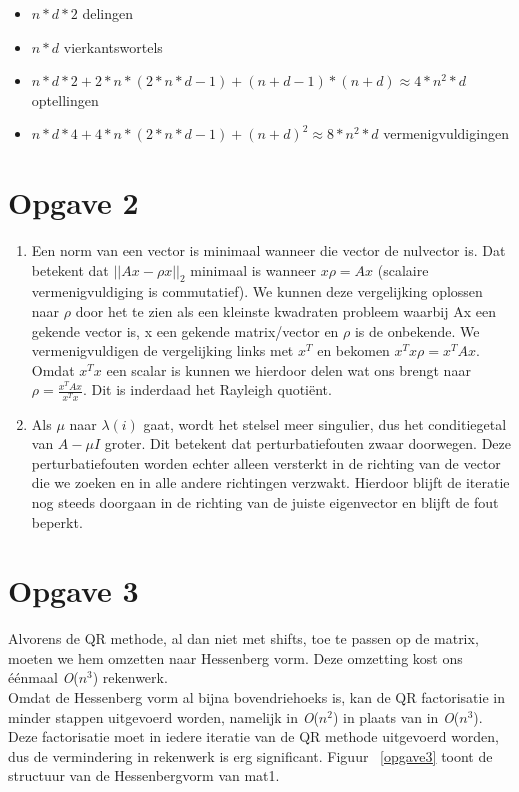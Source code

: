 \documentclass[]{article}
\newcommand{\opgave}[1]{\pagebreak\section*{Opgave #1}}
\begin{document}
\begin{itemize}
  \item $n*d*2$ delingen
  \item $n*d$ vierkantswortels
  \item $n*d*2 + 2*n*(2*n*d-1) + (n+d-1)*(n+d) \approx 4*n^2*d$ optellingen
  \item $n*d*4 + 4*n*(2*n*d-1) + (n+d)^2 \approx 8*n^2*d$ vermenigvuldigingen
\end{itemize}


\opgave2
\begin{enumerate}[label=\alph*)]

\item Een norm van een vector is minimaal wanneer die vector de nulvector is.
Dat betekent dat $||Ax-\rho x||_{2}$ minimaal is wanneer $x \rho = Ax$ (scalaire vermenigvuldiging is commutatief). We kunnen deze vergelijking oplossen naar $\rho$ door het te zien als een kleinste kwadraten probleem waarbij Ax een gekende vector is, x een gekende matrix/vector en $\rho$ is de onbekende. We vermenigvuldigen de vergelijking links met $x^T$ en bekomen $x^{T}x \rho = x^{T}Ax$. Omdat $x^{T}x$ een scalar is kunnen we hierdoor delen wat ons brengt naar $\rho = \frac{ x^{T}Ax}{x^{T}x}$. Dit is inderdaad het Rayleigh quoti\"{e}nt.\\

\noindent
\item Als $\mu$ naar $\lambda(i)$ gaat, wordt het stelsel meer singulier, dus het conditiegetal van $A-\mu I$ groter. Dit betekent dat perturbatiefouten zwaar doorwegen. Deze perturbatiefouten worden echter alleen versterkt in de richting van de vector die we zoeken en in alle andere richtingen verzwakt. Hierdoor blijft de iteratie nog steeds doorgaan in de richting van de juiste eigenvector en blijft de fout beperkt.
\end{enumerate}


\opgave{3}
Alvorens de QR methode, al dan niet met shifts, toe te passen op de matrix, moeten we hem omzetten naar Hessenberg vorm. Deze omzetting kost ons \'{e}\'{e}nmaal \textit{O}($n^3$) rekenwerk. \\
Omdat de Hessenberg vorm al bijna bovendriehoeks is, kan de QR factorisatie in minder stappen uitgevoerd worden, namelijk in \textit{O}($n^2$) in plaats van in \textit{O}($n^3$). Deze factorisatie moet in iedere iteratie van de QR methode uitgevoerd worden, dus  de vermindering in rekenwerk is erg significant. Figuur ~\ref{opgave3} toont de structuur van de  Hessenbergvorm van mat1.
\end{document}
